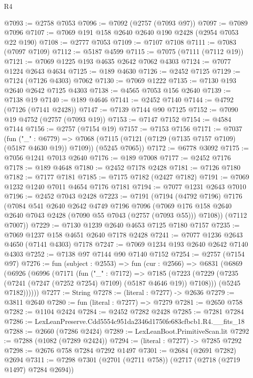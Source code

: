 \begin{lexlean}{R4}
\begin{coremodule}
@7093 := @2758 @7053
@7096 := @7092 (@2757 (@7093 @97))
@7097 := @7089 @7096
@7107 := @7069 @191 @158 @2640 @2640 @190 @2428 (@2954 @7053 @22 @190)
@7108 := @2777 @7053
@7109 := @7107 @7108
@7111 := @7083 (@7097 @7109)
@7112 := @5187 @4599
@7115 := @7075 (@7111 (@7112 @19))
@7121 := @7069 @1225 @193 @4635 @2642 @7062 @4303
@7124 := @7077 @1224 @2643 @4634
@7125 := @189 @4630
@7126 := @2452 @7125
@7129 := @7124 (@7126 @4303) @7062
@7130 := @7069 @1222
@7135 := @7130 @193 @2640 @2642 @7125 @4303
@7138 := @4565 @7053 @156 @2640
@7139 := @7138 @19
@7140 := @189 @4646
@7141 := @2452 @7140
@7144 := @4792 (@7126 (@7141 @2428))
@7147 := @7139 @7144 @90 @7125
@7152 := @7090 @19 @4752 (@2757 (@7093 @19))
@7153 := @7147 @7152
@7154 := @4584 @7144
@7156 := @2757 (@7154 @19)
@7157 := @7153 @7156
@7171 := @7037
    (fun ("_" : @6779) =>
    @7068 (@7115 (@7121 (@7129 (@7135 @7157 @7109) (@5187 @4630 @19)) @7109)) (@5245 @7065))
@7172 := @6778 @3092
@7175 := @7056 @1241 @7013 @2640
@7176 := @189 @7008
@7177 := @2452 @7176
@7178 := @189 @4648
@7180 := @2452 @7178 @2428
@7181 := @7126 @7180
@7182 := @7177 @7181
@7185 := @7175 @7182 (@2427 @7182)
@7191 := @7069 @1232 @1240 @7011 @4654 @7176 @7181
@7194 := @7077 @1231 @2643 @7010
@7196 := @2452 @7043 @2428
@7223 := @7191
    (@7194
      (@4792 @7196)
      @7176
      (@7084
        @541
        @2640
        @2642
        @4749
        @7196
        @7096
        (@7069 @176 @158 @2640 @2640 @7043 @2428 (@7090 @55 @7043 (@2757 (@7093 @55))) @7108))
      (@7112 @7007))
@7229 := @7130 @1239 @2640 @4653 @7125 @7180 @7157
@7235 := @7069 @1237 @158 @4651 @2640 @7178 @2428
@7241 := @7077 @1236 @2643 @4650 (@7141 @4303) @7178
@7247 := @7069 @1234 @193 @2640 @2642 @7140 @4303
@7252 := @7138 @97 @7144 @90 @7140 @7152
@7254 := @2757 (@7154 @97)
@7276 := fun (subject : @2553) =>
  fun (cur : @2566) =>
  @6831
    (@6869
      (@6926
        (@6996
          (@7171
            (fun ("_" : @7172) =>
            @7185
              (@7223 (@7229 (@7235 (@7241 (@7247 (@7252 @7254) @7109) (@5187 @4646 @19)) @7108)))
              (@5245 @7182))))))
@7277 := String
@7278 := (literal : @7277) -> @2636
@7279 := @3811 @2640
@7280 := fun (literal : @7277) => @7279
@7281 := @2650 @758
@7282 := @1104 @2424
@7284 := @2452 @7282 @2428
@7285 := @7281 @7284
@7286 := LexLeanPreserve.Cdd5554c951da2346d1750fe683cfbcb1.R4.__fits_18
@7288 := @2660 (@7286 @2424)
@7289 := LexLeanBoot.PrimitiveScan.lit
@7292 := @7288 (@1082 (@7289 @2424))
@7294 := (literal : @7277) -> @7285 @7292
@7298 := @2676 @758 @7284 @7292 @1497
@7301 := @2684 (@2691 @7282) @2694
@7311 := @7298 @7301 (@2701 (@2711 @758)) (@2717 (@2718 (@2719 @1497) @7284 @2694))

\end{coremodule}
\end{lexlean}
